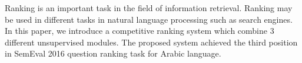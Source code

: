Ranking is an important task in the field of information retrieval. Ranking may be used in different tasks in natural language processing such as search engines. In this paper, we introduce a competitive ranking system which combine 3 different unsupervised modules. The proposed system achieved the third position in SemEval 2016 question ranking task for Arabic language.
